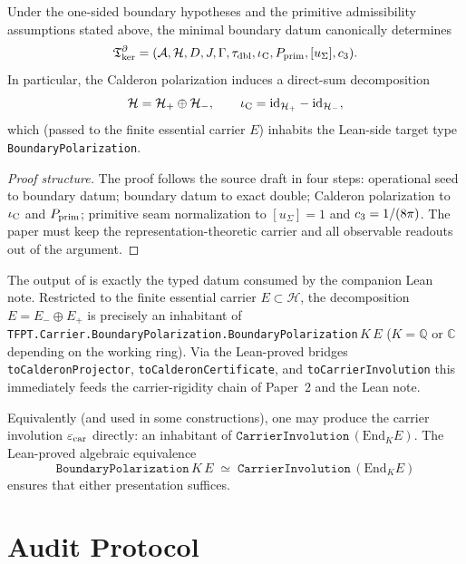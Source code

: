 \documentclass[11pt,a4paper]{article}
\begin{document}
\begin{theorem}
\label{thm:primitive-boundary-kernel}
Under the one-sided boundary hypotheses and the primitive admissibility assumptions stated above,
the minimal boundary datum canonically determines
\[
\mathfrak T_{\mathrm{ker}}^\partial
=
(\mathcal A,\mathcal H,D,J,\Gamma,\tau_{\mathrm{dbl}},\iota_{\mathrm C},P_{\mathrm{prim}},[u_\Sigma],c_3).
\]
In particular, the Calderon polarization induces a direct-sum decomposition
\[
\mathcal H = \mathcal H_+ \oplus \mathcal H_-,
\qquad
\iota_{\mathrm C} = \mathrm{id}_{\mathcal H_+} - \mathrm{id}_{\mathcal H_-},
\]
which (passed to the finite essential carrier $E$) inhabits the Lean-side target type
\texttt{BoundaryPolarization}.
\end{theorem}

\begin{proof}[Proof structure]
The proof follows the source draft in four steps: operational seed to boundary datum; boundary
datum to exact double; Calderon polarization to $\iota_{\mathrm C}$ and $P_{\mathrm{prim}}$; primitive seam normalization to
$[u_\Sigma]=1$ and $c_3=1/(8\pi)$. The paper must keep the representation-theoretic carrier
and all observable readouts out of the argument.
\end{proof}

\begin{remark}
\label{rem:lean-target-paper1}
The output of  is exactly the typed datum consumed by the
companion Lean note. Restricted to the finite essential carrier $E \subset \mathcal H$, the
decomposition $E = E_- \oplus E_+$ is precisely an inhabitant of
\texttt{TFPT.Carrier.BoundaryPolarization.BoundaryPolarization}$\,K\,E$
($K = \mathbb Q$ or $\mathbb C$ depending on the working ring). Via the Lean-proved bridges
\texttt{toCalderonProjector}, \texttt{toCalderonCertificate}, and
\texttt{toCarrierInvolution} this immediately feeds the carrier-rigidity chain
of Paper~2 and the Lean note.

Equivalently (and used in some constructions), one may produce the carrier involution
$\varepsilon_{\mathrm{car}}$ directly: an inhabitant of $\texttt{CarrierInvolution}\,(\mathrm{End}_K E)$. The Lean-proved
algebraic equivalence
\[
\texttt{BoundaryPolarization}\,K\,E
\;\simeq\;
\texttt{CarrierInvolution}\,(\mathrm{End}_K E)
\]
ensures that either presentation suffices.
\end{remark}

\section{Audit Protocol}
\end{document}
